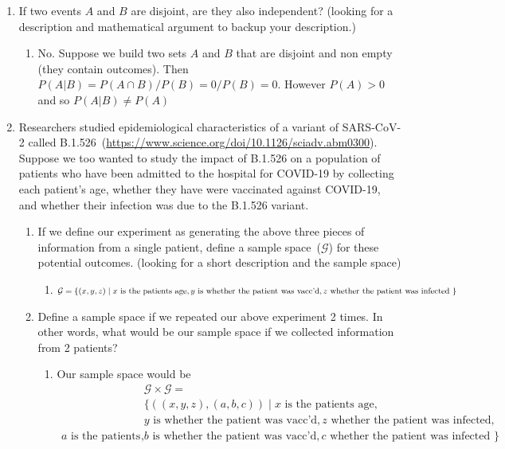 \documentclass[krantz1,ChapterTOCs]{krantz}
\begin{document}
\begin{enumerate}
   \item If two events $A$ and $B$ are disjoint, are they also independent? (looking for a description and mathematical argument to backup your description.)
   \begin{enumerate}
        \item {\color{red} No. Suppose we build two sets $A$ and $B$ that are disjoint and non empty (they contain outcomes). Then $P(A|B) = P(A \cap B) / P(B) = 0/P(B) = 0 $. However $P(A) > 0$ and so $P(A|B) \neq P(A)$      }
    \end{enumerate}
   
   \item Researchers studied epidemiological characteristics of a variant of SARS-CoV-2 called B.1.526~(\url{https://www.science.org/doi/10.1126/sciadv.abm0300}). Suppose we too wanted to study the impact of B.1.526 on a population of patients who have been admitted to the hospital for COVID-19 by collecting each patient's age, whether they have were vaccinated against COVID-19, and whether their infection was due to the B.1.526 variant.
   
   \begin{enumerate}
       \item If we define our experiment as generating the above three pieces of information from a single patient, define a sample space~($\mathcal{G}$) for these potential outcomes. (looking for a short description and the sample space)
       \begin{enumerate}
           \item {\color{red}  $\mathcal{G} = \{ (x,y,z)\; | \; x \text{ is the patients age},\\ y \text{ is whether the patient was vacc'd}, z \text{ whether the patient was infected } \}$    }
       \end{enumerate}
       \item Define a sample space if we repeated our above experiment 2 times. In other words, what would be our sample space if we collected information from 2 patients? 
       \begin{enumerate}
           \item {\color{red} Our sample space would be 
           \begin{align*}
               &\mathcal{G} \times \mathcal{G} =  \\ 
               &\{ (  (x,y,z), (a,b,c) )\; | \; x \text{ is the patients age},\\ 
               &y \text{ is whether the patient was vacc'd}, z \text{ whether the patient was infected},\\
               a \text{ is the patients age},
               &b \text{ is whether the patient was vacc'd}, c \text{ whether the patient was infected } \}
           \end{align*}
           
}
\end{enumerate}
\end{enumerate}
\end{enumerate}
\end{document}
